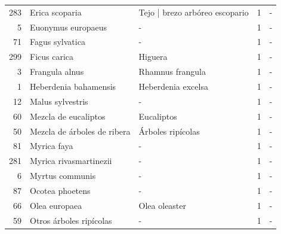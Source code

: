 \begin{longtable}{r p{4cm} p{5cm} c c}
    283           & Erica scoparia                    & Tejo | brezo arbóreo escopario                & 1             & -              \\
    5             & Euonymus europaeus                & -                                             & 1             & -              \\
    71            & Fagus sylvatica                   & -                                             & 1             & -              \\
    299           & Ficus carica                      & Higuera                                       & 1             & -              \\
    3             & Frangula alnus                    & Rhamnus frangula                              & 1             & -              \\
    1             & Heberdenia bahamensis             & Heberdenia excelsa                            & 1             & -              \\
    12            & Malus sylvestris                  & -                                             & 1             & -              \\
    60            & Mezcla de eucaliptos              & Eucaliptos                                    & 1             & -              \\
    50            & Mezcla de árboles de ribera       & Árboles ripícolas                             & 1             & -              \\
    81            & Myrica faya                       & -                                             & 1             & -              \\
    281           & Myrica rivasmartinezii            & -                                             & 1             & -              \\
    6             & Myrtus communis                   & -                                             & 1             & -              \\
    87            & Ocotea phoetens                   & -                                             & 1             & -              \\
    66            & Olea europaea                     & Olea oleaster                                 & 1             & -              \\
    59            & Otros árboles ripícolas           & -                                             & 1             & -              \\

\end{longtable}
